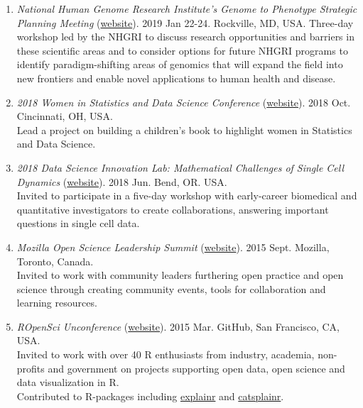 \documentclass[10pt]{article}
\newcommand{\mycon}[1]{\smallskip\begin{enumerate}[resume,label={\scriptsize \arabic*$\ $},leftmargin=\parindent]\setlength{\itemsep}{#1}\vspace*{-0.7em}}
\newcommand{\ee}{\end{enumerate}}
\begin{document}
\mycon{0.3em}

\item 
{\it National Human Genome Research Institute’s Genome to Phenotype Strategic Planning Meeting} (\href{https://www.genome.gov/27570372/nhgri-strategic-planning-process-establishing-a-2020-vision-for-genomics/}{website}). 2019 Jan 22-24. Rockville, MD, USA. Three-day workshop led by the NHGRI to discuss research opportunities and barriers in these scientific areas and to consider options for future NHGRI programs to identify paradigm-shifting areas of genomics that will expand the field into new frontiers and enable novel applications to human health and disease.
\item 
{\it 2018 Women in Statistics and Data Science Conference} (\href{https://ww2.amstat.org/meetings/wsds/2018/}{website}). 2018 Oct. Cincinnati, OH, USA. \\
Lead a project on building a children's book to highlight women in Statistics and Data Science.
\item 
{\it 2018 Data Science Innovation Lab: Mathematical Challenges of Single Cell Dynamics} (\href{https://bigdatau.ini.usc.edu/innovationlab2018}{website}). 2018 Jun. Bend, OR. USA. \\
Invited to participate in a five-day workshop with early-career biomedical and quantitative investigators to create collaborations, answering important questions in single cell data.
\item 
{\it Mozilla Open Science Leadership Summit} (\href{https://www.mozillascience.org/open-science-summit-2015}{website}). 2015 Sept. Mozilla, Toronto, Canada. \\
Invited to work with community leaders furthering open practice and open science through creating community events, tools for collaboration and learning resources.
\item 
{\it ROpenSci Unconference} (\href{http://unconf.ropensci.org}{website}). 2015 Mar. GitHub, San Francisco, CA, USA. \\ 
Invited to work with over 40 R enthusiasts from industry, academia, non-profits and government on projects supporting open data, open science and data visualization in R.  \\
Contributed to R-packages including \href{https://github.com/hilaryparker/explainr}{explainr} and \href{https://github.com/hilaryparker/catsplainr}{catsplainr}. 

\ee
\end{document}
